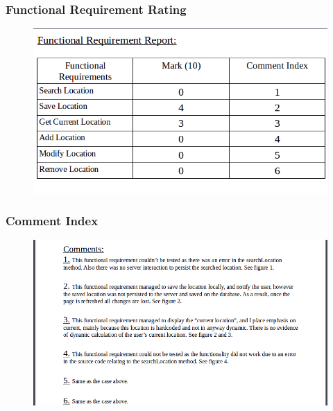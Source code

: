 \documentclass[english]{article}
\begin{document}
\subsubsection{Functional Requirement Rating}
\begin{figure}[H]
\hspace*{-2.5cm}
\includegraphics[width=180cm]{mark-tbl-poi.png}
\end{figure}
\subsubsection{Comment Index}
\begin{figure}[H]
\hspace*{-2.5cm}
\includegraphics[width=180cm]{comments-poi.png}
\end{figure}
\end{document}

